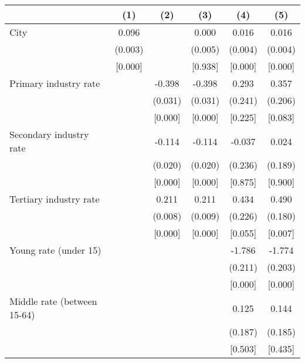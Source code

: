{
\def\sym#1{\ifmmode^{#1}\else\(^{#1}\)\fi}
\begin{tabular}{l*{5}{c}}
\hline\hline
                    &\multicolumn{1}{c}{(1)}&\multicolumn{1}{c}{(2)}&\multicolumn{1}{c}{(3)}&\multicolumn{1}{c}{(4)}&\multicolumn{1}{c}{(5)}\\
\hline
City                &       0.096&            &       0.000&       0.016&       0.016\\
                    &     (0.003)&            &     (0.005)&     (0.004)&     (0.004)\\
                    &     [0.000]&            &     [0.938]&     [0.000]&     [0.000]\\
Primary industry rate&            &      -0.398&      -0.398&       0.293&       0.357\\
                    &            &     (0.031)&     (0.031)&     (0.241)&     (0.206)\\
                    &            &     [0.000]&     [0.000]&     [0.225]&     [0.083]\\
Secondary industry rate&            &      -0.114&      -0.114&      -0.037&       0.024\\
                    &            &     (0.020)&     (0.020)&     (0.236)&     (0.189)\\
                    &            &     [0.000]&     [0.000]&     [0.875]&     [0.900]\\
Tertiary industry rate&            &       0.211&       0.211&       0.434&       0.490\\
                    &            &     (0.008)&     (0.009)&     (0.226)&     (0.180)\\
                    &            &     [0.000]&     [0.000]&     [0.055]&     [0.007]\\
Young rate (under 15)&            &            &            &      -1.786&      -1.774\\
                    &            &            &            &     (0.211)&     (0.203)\\
                    &            &            &            &     [0.000]&     [0.000]\\
Middle rate (between 15-64)&            &            &            &       0.125&       0.144\\
                    &            &            &            &     (0.187)&     (0.185)\\
                    &            &            &            &     [0.503]&     [0.435]\\

\end{tabular}}
